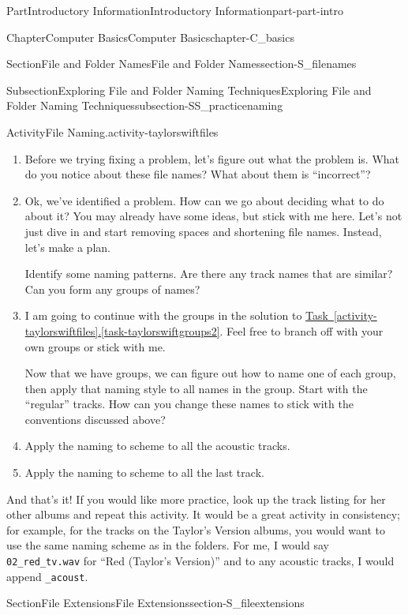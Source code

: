 \documentclass[oneside,10pt,]{book}
\newcommand{\xreffont}{\relax}
\newcommand{\mono}[1]{\texttt{#1}}
\begin{document}
\begin{partptx}{Part}{Introductory Information}{}{Introductory Information}{}{}{part-part-intro}
\begin{chapterptx}{Chapter}{Computer Basics}{}{Computer Basics}{}{}{chapter-C_basics}
\begin{sectionptx}{Section}{File and Folder Names}{}{File and Folder Names}{}{}{section-S_filenames}
\begin{subsectionptx}{Subsection}{Exploring File and Folder Naming Techniques}{}{Exploring File and Folder Naming Techniques}{}{}{subsection-SS_practicenaming}
\begin{activity}{Activity}{File Naming.}{activity-taylorswiftfiles}
\begin{enumerate}[font=\bfseries,label=(\alph*),ref=\alph*]
\item{}Before we trying fixing a problem, let's figure out what the problem is. What do you notice about these file names? What about them is ``incorrect''?%
\item\label{task-taylorswiftgroups2}Ok, we've identified a problem. How can we go about deciding what to do about it? You may already have some ideas, but stick with me here. Let's not just dive in and start removing spaces and shortening file names. Instead, let's make a plan.%
\par
Identify some naming patterns. Are there any track names that are similar? Can you form any groups of names?%
\item{}I am going to continue with the groups in the solution to \hyperref[task-taylorswiftgroups2]{Task~{\xreffont\ref{activity-taylorswiftfiles}}.{\xreffont\ref{task-taylorswiftgroups2}}}. Feel free to branch off with your own groups or stick with me.%
\par
Now that we have groups, we can figure out how to name one of each group, then apply that naming style to all names in the group. Start with the ``regular'' tracks. How can you change these names to stick with the conventions discussed above?%
\item{}Apply the naming to scheme to all the acoustic tracks.%
\item{}Apply the naming to scheme to all the last track.%
\end{enumerate}%
And that's it! If you would like more practice, look up the track listing for her other albums and repeat this activity. It would be a great activity in consistency; for example, for the tracks on the Taylor's Version albums, you would want to use the same naming scheme as in the folders. For me, I would say \mono{02\_red\_tv.wav} for ``Red (Taylor's Version)'' and to any acoustic tracks, I would append \mono{\_acoust}.%
\end{activity}%
\end{subsectionptx}
\end{sectionptx}
%
%
\typeout{************************************************}
\typeout{************************************************}
%
\begin{sectionptx}{Section}{File Extensions}{}{File Extensions}{}{}{section-S_fileextensions}
%
\begin{introduction}{}%

\end{introduction}
\end{sectionptx}
\end{chapterptx}
\end{partptx}
\end{document}
